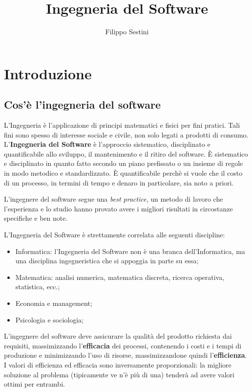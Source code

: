 \documentclass[10pt,a4paper]{article}
\title{Ingegneria del Software}
\author{Filippo Sestini}
\newcommand{\strong}[1]{\textbf{#1}}
\newcommand{\frgnword}[1]{\textit{#1}}
\begin{document}
\maketitle
\tableofcontents

\section{Introduzione}
\subsection{Cos'è l'ingegneria del software}
L'Ingegneria è l'applicazione di principi matematici e fisici per fini pratici. Tali fini sono spesso di interesse sociale e civile, non solo legati a prodotti di consumo. L'\strong{\gls{Ingegneria del Software}} è l'approccio sistematico, disciplinato e quantificabile allo sviluppo, il mantenimento e il ritiro del software. È sistematico e disciplinato in quanto fatto secondo un piano prefissato o un insieme di regole in modo metodico e standardizzato. È quantificabile perchè si vuole che il costo di un processo, in termini di tempo e denaro in particolare, sia noto a priori.

L'ingegnere del software segue una \frgnword{\gls{best practice}}, un metodo di lavoro che l'esperienza e lo studio hanno provato avere i migliori risultati in circostanze specifiche e ben note.

L'Ingegneria del Software è strettamente correlata alle seguenti discipline:
\begin{itemize}
	\item Informatica: l'Ingegneria del Software non è una branca dell'Informatica, ma una disciplina ingegneristica che si appoggia in parte su essa;
	\item Matematica: analisi numerica, matematica discreta, ricerca operativa, statistica, ecc.;
	\item Economia e management;
	\item Psicologia e sociologia;
\end{itemize}

L'ingegnere del software deve assicurare la qualità del prodotto richiesta dai requisiti, massimizzando l'\strong{\gls{efficacia}} dei processi, contenendo i costi e i tempi di produzione e minimizzando l'uso di risorse, massimizzandone quindi l'\strong{\gls{efficienza}}. I valori di efficienza ed efficacia sono inversamente proporzionali: la migliore soluzione al problema (tipicamente ve n'è più di una) tenderà ad avere valori ottimi per entrambi.
\end{document}
